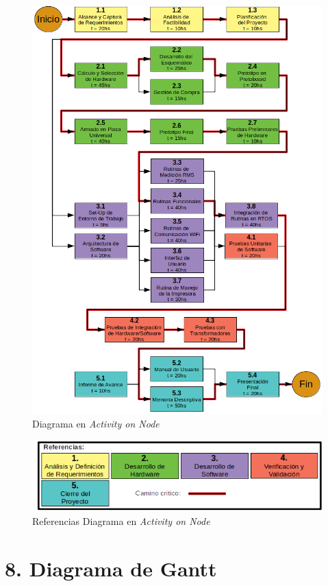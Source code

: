 \documentclass[11pt]{charter}
\begin{document}
\begin{figure}[htpb]
\centering 
\includegraphics[width=.8\textwidth]{./Figuras/AoN.png}
\caption{Diagrama en \textit{Activity on Node}}
\label{fig:AoN}
\end{figure}



\begin{figure}[htpb]
\centering 
\includegraphics[width=.8\textwidth]{./Figuras/AoN_ref.png}
\caption{Referencias Diagrama en \textit{Activity on Node}}
\label{fig:AoN_ref}
\end{figure}


\newpage
\section{8. Diagrama de Gantt}
\label{sec:gantt}
\end{document}
